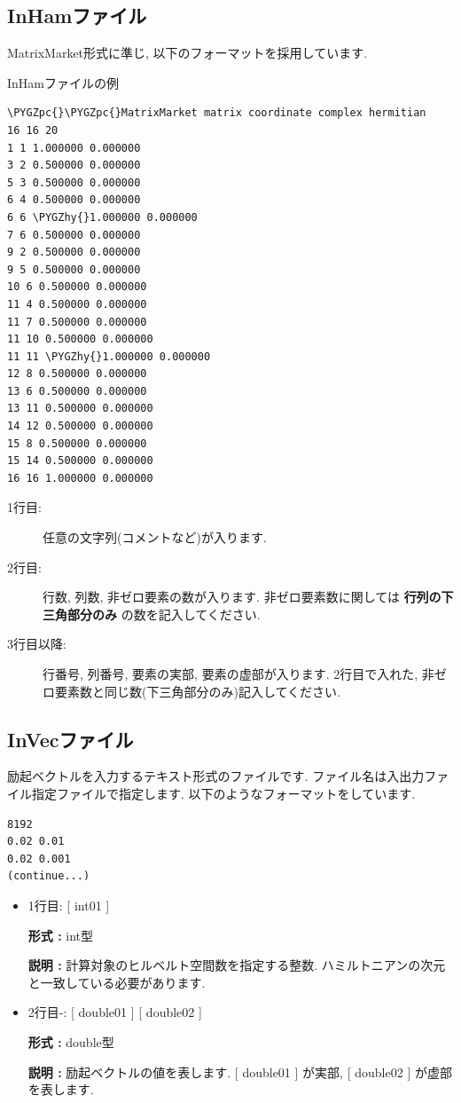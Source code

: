 \documentclass[letterpaper,10pt,dvipdfmx,openany]{sphinxmanual}
\def\PYGZpc{\char`\%}
\def\PYGZhy{\char`\-}
\begin{document}
\subsection{InHamファイル}
\label{shiftk_format_ja:inham}\label{shiftk_format_ja:ham}
MatrixMarket形式に準じ, 以下のフォーマットを採用しています.

InHamファイルの例

\begin{Verbatim}[commandchars=\\\{\}]
\PYGZpc{}\PYGZpc{}MatrixMarket matrix coordinate complex hermitian
16 16 20
1 1 1.000000 0.000000
3 2 0.500000 0.000000
5 3 0.500000 0.000000
6 4 0.500000 0.000000
6 6 \PYGZhy{}1.000000 0.000000
7 6 0.500000 0.000000
9 2 0.500000 0.000000
9 5 0.500000 0.000000
10 6 0.500000 0.000000
11 4 0.500000 0.000000
11 7 0.500000 0.000000
11 10 0.500000 0.000000
11 11 \PYGZhy{}1.000000 0.000000
12 8 0.500000 0.000000
13 6 0.500000 0.000000
13 11 0.500000 0.000000
14 12 0.500000 0.000000
15 8 0.500000 0.000000
15 14 0.500000 0.000000
16 16 1.000000 0.000000
\end{Verbatim}
\begin{description}
\item[{1行目:}] \leavevmode
任意の文字列(コメントなど)が入ります.

\item[{2行目:}] \leavevmode
行数, 列数, 非ゼロ要素の数が入ります.
非ゼロ要素数に関しては \textbf{行列の下三角部分のみ} の数を記入してください.

\item[{3行目以降:}] \leavevmode
行番号, 列番号, 要素の実部, 要素の虚部が入ります.
2行目で入れた, 非ゼロ要素数と同じ数(下三角部分のみ)記入してください.

\end{description}


\subsection{InVecファイル}
\label{shiftk_format_ja:invec}\label{shiftk_format_ja:vec}
励起ベクトルを入力するテキスト形式のファイルです.
ファイル名は入出力ファイル指定ファイルで指定します.
以下のようなフォーマットをしています.

\begin{Verbatim}[commandchars=\\\{\}]
8192
0.02 0.01
0.02 0.001
(continue...)
\end{Verbatim}
\begin{itemize}
\item {} 
1行目: {[} int01 {]}

\textbf{形式 :} int型

\textbf{説明 :} 計算対象のヒルベルト空間数を指定する整数.
ハミルトニアンの次元と一致している必要があります.

\item {} 
2行目-:
{[} double01 {]} {[} double02 {]}

\textbf{形式 :} double型

\textbf{説明 :} 励起ベクトルの値を表します.
{[} double01 {]} が実部, {[} double02 {]} が虚部を表します.

\end{itemize}
\end{document}
